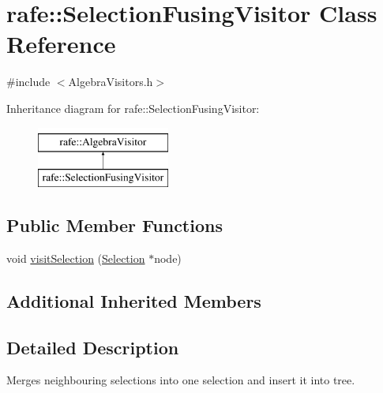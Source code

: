 \hypertarget{classrafe_1_1_selection_fusing_visitor}{\section{rafe\+:\+:Selection\+Fusing\+Visitor Class Reference}
\label{classrafe_1_1_selection_fusing_visitor}
}


{\ttfamily \#include $<$Algebra\+Visitors.\+h$>$}

Inheritance diagram for rafe\+:\+:Selection\+Fusing\+Visitor\+:\begin{figure}[H]
\begin{center}
\leavevmode
\includegraphics[height=2.000000cm]{classrafe_1_1_selection_fusing_visitor}
\end{center}
\end{figure}
\subsection*{Public Member Functions}
\begin{DoxyCompactItemize}
\item 
void \hyperlink{classrafe_1_1_selection_fusing_visitor_a4f728e97bda224020772f6a7c7cbb775}{visit\+Selection} (\hyperlink{classrafe_1_1_selection}{Selection} $\ast$node)
\end{DoxyCompactItemize}
\subsection*{Additional Inherited Members}


\subsection{Detailed Description}
Merges neighbouring selections into one selection and insert it into tree. 

